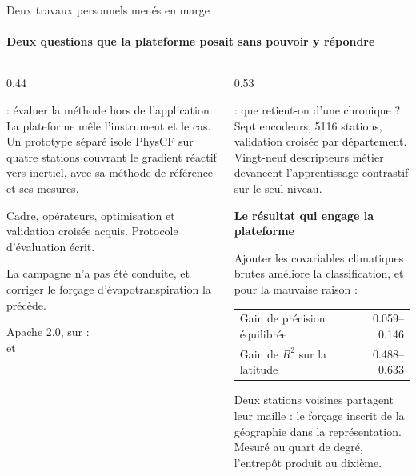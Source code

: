 \documentclass[aspectratio=169,11pt]{beamer}
\begin{document}
\begin{frame}{Deux travaux personnels menés en marge}
\framesubtitle{Deux questions que la plateforme posait sans pouvoir y répondre}

\begin{columns}[T]
\begin{column}{0.44\textwidth}
\small
\begin{apport}{ : évaluer la méthode hors de l'application}
La plateforme mêle l'instrument et le cas. Un prototype séparé isole PhysCF sur quatre stations
couvrant le gradient réactif vers inertiel, avec sa méthode de référence et ses mesures.
\end{apport}
{\footnotesize Cadre, opérateurs, optimisation et validation croisée acquis. Protocole
d'évaluation écrit.\par}
\vspace{0.15em}
{\footnotesize\color{rougesobre} La campagne n'a pas été conduite, et corriger le forçage
d'évapotranspiration la précède.\par}
\vspace{0.6em}
{\scriptsize\color{grisardoise} Apache 2.0, sur  :\\
 et \par}
\end{column}

\begin{column}{0.53\textwidth}
\small
\begin{apport}{ : que retient-on d'une chronique ?}
Sept encodeurs, \num{5116} stations, validation croisée par département. Vingt-neuf descripteurs
métier devancent l'apprentissage contrastif sur le seul niveau.
\end{apport}

\vspace{0.1em}
{\footnotesize\color{bleuprofond}\bfseries Le résultat qui engage la plateforme\par}
\vspace{0.15em}
\footnotesize
Ajouter les covariables climatiques brutes améliore la classification, et pour la mauvaise raison :

\vspace{0.2em}
\begin{center}
\begin{tabular}{@{}lr@{}}
\toprule
Gain de précision équilibrée & \numrange{+0,059}{+0,146} \\
Gain de $R^2$ sur la latitude & \numrange{+0,488}{+0,633} \\
\bottomrule
\end{tabular}
\end{center}

\vspace{0.15em}
Deux stations voisines partagent leur maille : le forçage inscrit de la géographie dans la
représentation. Mesuré au quart de degré, l'entrepôt produit au dixième.
\end{column}
\end{columns}
\end{frame}
\end{document}
